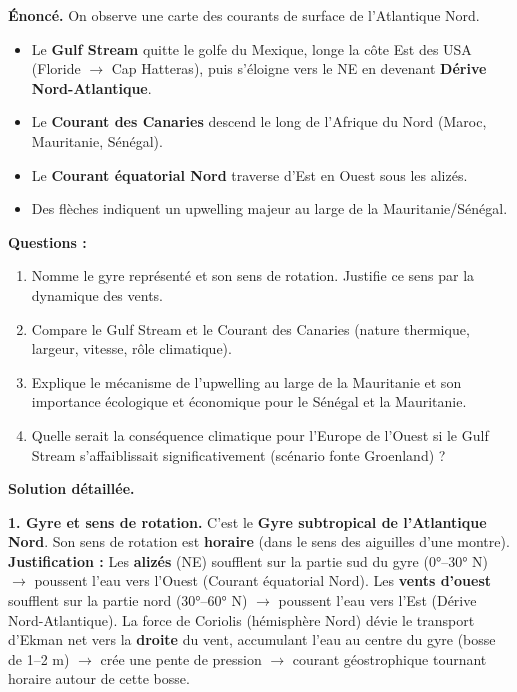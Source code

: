 \documentclass[11pt]{article}
\begin{document}
\begin{exoresolu}
\textbf{Énoncé.} On observe une carte des courants de surface de l'Atlantique Nord.
\begin{itemize}
    \item Le \textbf{Gulf Stream} quitte le golfe du Mexique, longe la côte Est des USA (Floride $\to$ Cap Hatteras), puis s'éloigne vers le NE en devenant \textbf{Dérive Nord-Atlantique}.
    \item Le \textbf{Courant des Canaries} descend le long de l'Afrique du Nord (Maroc, Mauritanie, Sénégal).
    \item Le \textbf{Courant équatorial Nord} traverse d'Est en Ouest sous les alizés.
    \item Des flèches indiquent un upwelling majeur au large de la Mauritanie/Sénégal.
\end{itemize}
\textbf{Questions :}
\begin{enumerate}
    \item Nomme le gyre représenté et son sens de rotation. Justifie ce sens par la dynamique des vents.
    \item Compare le Gulf Stream et le Courant des Canaries (nature thermique, largeur, vitesse, rôle climatique).
    \item Explique le mécanisme de l'upwelling au large de la Mauritanie et son importance écologique et économique pour le Sénégal et la Mauritanie.
    \item Quelle serait la conséquence climatique pour l'Europe de l'Ouest si le Gulf Stream s'affaiblissait significativement (scénario fonte Groenland) ?
\end{enumerate}

\tcblower
\textbf{Solution détaillée.}

\textbf{1. Gyre et sens de rotation.}
C'est le \textbf{Gyre subtropical de l'Atlantique Nord}. Son sens de rotation est \textbf{horaire} (dans le sens des aiguilles d'une montre).
\textbf{Justification :} Les \textbf{alizés} (NE) soufflent sur la partie sud du gyre (0°--30° N) $\to$ poussent l'eau vers l'Ouest (Courant équatorial Nord). Les \textbf{vents d'ouest} soufflent sur la partie nord (30°--60° N) $\to$ poussent l'eau vers l'Est (Dérive Nord-Atlantique). La force de Coriolis (hémisphère Nord) dévie le transport d'Ekman net vers la \textbf{droite} du vent, accumulant l'eau au centre du gyre (bosse de 1--2 m) $\to$ crée une pente de pression $\to$ courant géostrophique tournant horaire autour de cette bosse.


\end{exoresolu}
\end{document}
